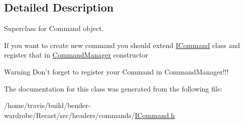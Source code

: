\subsection{Detailed Description}
Superclass for Command object. 

If you want to create new command you should extend \hyperlink{class_i_command}{I\-Command} class and register that in \hyperlink{class_command_manager}{Command\-Manager} constructor

\begin{DoxyWarning}{Warning}
Don't forget to register your Command in Command\-Manager!!! 
\end{DoxyWarning}


The documentation for this class was generated from the following file\-:\begin{DoxyCompactItemize}
\item 
/home/travis/build/bender-\/wardrobe/\-Recast/src/headers/commands/\hyperlink{_i_command_8h}{I\-Command.\-h}\end{DoxyCompactItemize}
